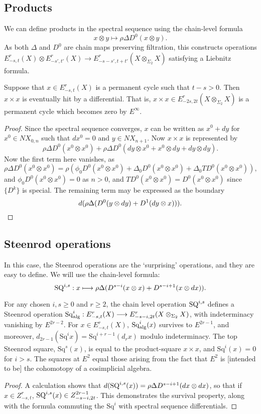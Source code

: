 \documentclass[10pt]{article}
\newcommand{\Sq}{\mathrm{Sq}}
\begin{document}
\begin{AdamsSSEQ operations final}
\subsection{Products}
We can define products in the spectral sequence using the chain-level formula
\[x\otimes y\mapsto\rho\Delta D^0(x\otimes y).\]
As both $\Delta$ and $D^0$ are chain maps preserving filtration, this constructs operations $E^r_{-s,t}(X)\otimes E^r_{-s',t'}(X)\to E^r_{-s-s',t+t'}(X\otimes_{\Sigma_2}X)$ satisfying a Liebnitz formula.
\begin{prop}
Suppose that $x\in E^r_{-s,t}(X)$ is a permanent cycle such that $t-s>0$. Then $x\times x$ is eventually hit by a differential. That is, $x\times x\in E^r_{-2s,2t}(X\otimes_{\Sigma_2}X)$ is a permanent cycle which becomes zero by $E^\infty$.
\end{prop}
\begin{proof}
Since the spectral sequence converges, $x$ can be written as $x^0+dy$ for $x^0\in NX_{0,n}$ such that $dx^0=0$ and $y\in NX_{n+1}$. Now $x\times x$ is represented by
\[\rho\Delta D^0(x^0\otimes x^0)+\rho\Delta D^0(dy\otimes x^0+x^0\otimes dy+dy\otimes dy).\]
Now the first term here vanishes, as
\[\rho\Delta D^0(x^0\otimes x^0)=\rho(\phi_0 D^0(x^0\otimes x^0)+\Delta_0 D^0(x^0\otimes x^0)+\Delta_0 TD^0(x^0\otimes x^0)),\]
and $\phi_0D^0(x^0\otimes x^0)=0$ as $n>0$, and $TD^0(x^0\otimes x^0)=D^0(x^0\otimes x^0)$ since $\{D^k\}$ is special. The remaining term may be expressed as the boundary
\[d(\rho\Delta(D^0(y\otimes dy)+D^1(dy\otimes x))).\qedhere\]


\end{proof}


\subsection{Steenrod operations}
In this case, the Steenrod operations are the `surprising' operations, and they are easy to define. We will use the chain-level formula:
\[\textup{SQ}^{i,s}:x\mapsto \rho\Delta (D^{s-i}(x\otimes x)+D^{s-i+1}(x\otimes dx)).\]
\begin{prop}
For any chosen $i,s\geq0$ and $r\geq2$, the chain level operation $\textup{SQ}^{i,s}$ defines a Steenrod operation $\Sq^i_\textup{alg}:E^r_{-s,t}(X)\to E^r_{-s-i,2t}(X\otimes_{\Sigma_2}X)$, with indeterminacy vanishing by $E^{2r-2}$. For $x\in E^r_{-s,t}(X)$, $\Sq^i_\textup{alg}(x)$ survives to $E^{2r-1}$, and moreover, $d_{2r-1}(\Sq^ix)=\Sq^{i+r-1}(d_rx)$ modulo indeterminacy. The top Steenrod square, $\Sq^s(x)$, is equal to the product-square $x\times x$, and $\Sq^i(x)=0$ for $i>s$. The squares at $E^2$ equal those arising from the fact that $E^2$ is [intended to be] the cohomotopy of a cosimplicial algebra.
\end{prop}
\begin{proof}
A calculation shows that $d(\textup{SQ}^{i,s}(x))=\rho\Delta D^{s-i+1}(dx\otimes dx)$, so that if $x\in Z^r_{-s,t}$, $\textup{SQ}^{i,s}(x)\in Z^{2r-1}_{-s-i,2t}$. This demonstrates the survival property, along with the formula commuting the $\Sq^i$ with spectral sequence differentials.


\end{proof}
\end{AdamsSSEQ operations final}
\end{document}
